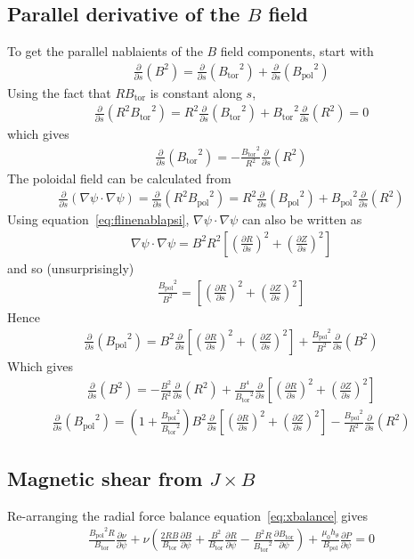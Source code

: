 \documentclass[12pt]{article}
\def\L{\left}
\def\R{\right}
\newcommand{\deriv}[2]{\ensuremath{\frac{\partial #1}{\partial #2}}}
\newcommand{\hthe}{\ensuremath{h_\theta}}
\newcommand{\Bp}{\ensuremath{B_{\text{pol}}}}
\newcommand{\Bt}{\ensuremath{B_{\text{tor}}}}
\begin{document}
\subsection{Parallel derivative of the \texorpdfstring{$B$}{B} field}
%
To get the parallel nablaients of the $B$ field components, start with
%
\begin{align*}
\deriv{}{s}\L(B^2\R) = \deriv{}{s}\L(\Bt^2\R) + \deriv{}{s}\L(\Bp^2\R)
\end{align*}
%
Using the fact that $R\Bt$ is constant along $s$,
%
\begin{align*}
\deriv{}{s}\L(R^2\Bt^2\R) = R^2\deriv{}{s}\L(\Bt^2\R) +
\Bt^2\deriv{}{s}\L(R^2\R) = 0
\end{align*}
%
which gives
%
\begin{align*}
  \deriv{}{s}\L(\Bt^2\R) = -\frac{\Bt^2}{R^2}\deriv{}{s}\L(R^2\R)
\end{align*}
%
The poloidal field can be calculated from
%
\begin{align*}
\deriv{}{s}\L(\nabla\psi \cdot \nabla\psi\R) = \deriv{}{s}\L(R^2\Bp^2\R) =
R^2\deriv{}{s}\L(\Bp^2\R) + \Bp^2\deriv{}{s}\L(R^2\R)
\end{align*}
%
Using equation~\ref{eq:flinenablapsi}, $\nabla\psi \cdot \nabla\psi$ can also
be written as
%
\begin{align*}
\nabla\psi \cdot \nabla\psi = B^2R^2\L[\L(\deriv{R}{s}\R)^2 +
\L(\deriv{Z}{s}\R)^2\R]
\end{align*}
%
and so (unsurprisingly)
%
\begin{align*}
\frac{\Bp^2}{B^2} = \L[\L(\deriv{R}{s}\R)^2 + \L(\deriv{Z}{s}\R)^2\R]
\end{align*}
%
Hence
%
\begin{align*}
\deriv{}{s}\L(\Bp^2\R) = B^2\deriv{}{s}\L[\L(\deriv{R}{s}\R)^2 +
\L(\deriv{Z}{s}\R)^2\R] + \frac{\Bp^2}{B^2}\deriv{}{s}\L(B^2\R)
\end{align*}
%
Which gives
%
\begin{align*}
\deriv{}{s}\L(B^2\R) = -\frac{B^2}{R^2}\deriv{}{s}\L(R^2\R) +
\frac{B^4}{\Bt^2}\deriv{}{s}\L[\L(\deriv{R}{s}\R)^2 + \L(\deriv{Z}{s}\R)^2\R]
\end{align*}
%
\begin{align*}
\deriv{}{s}\L(\Bp^2\R) = \L(1 +
\frac{\Bp^2}{\Bt^2}\R)B^2\deriv{}{s}\L[\L(\deriv{R}{s}\R)^2 +
\L(\deriv{Z}{s}\R)^2\R] - \frac{\Bp^2}{R^2}\deriv{}{s}\L(R^2\R)
\end{align*}
%



\subsection{Magnetic shear from \texorpdfstring{$J\times B$}{J x B}}
%
Re-arranging the radial force balance equation~\ref{eq:xbalance} gives
%
\begin{align*}
\frac{\Bp^2R}{\Bt}\deriv{\nu}{\psi} + \nu\L(\frac{2RB}{\Bt}\deriv{B}{\psi} +
\frac{B^2}{\Bt}\deriv{R}{\psi} - \frac{B^2R}{\Bt^2}\deriv{\Bt}{\psi}\R) +
\frac{\mu_0\hthe}{\Bp}\deriv{P}{\psi} = 0
\end{align*}
%
\end{document}
